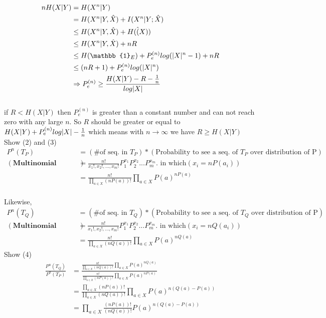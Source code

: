 \documentclass[
  course = {{EE623 Information Theory}},
  quartile = {{4}},
  assignment = 4,
  name = {{Mohammad Mahdi Rahimi}},
  studentnumber = {{20208244}},
  email = {{mahi@kaist.ac.kr}},
  firstexercise = 1
]{aga-homework}
\begin{document}
\begin{equation} \label{eq3}
\begin{split}
nH(X|Y) & = H(X^n|Y) \\
& = H(X^n|Y, \hat{X}) + I(X^n|Y; \hat{X})\\
& \le  H(X^n|Y, \hat{X}) + H(\hat(X))\\
& \le  H(X^n|Y, \hat{X}) + nR\\
& \le H(\mathbb{1}_E) + P^{(n)}_e log(|X|^n - 1) + nR\\
& \le (nR + 1) + P^{(n)}_e log(|X|^n)\\
& \Rightarrow P^{(n)}_e \ge \frac{H(X|Y) - R - {1 \over n}}{log|X|}
\end{split}
\end{equation}\\
if $R < H(X|Y)$ then $P^{(n)}_e$ is greater than a constant number and can not reach zero with any large $n$. So $R$ should be greater or equal to $H(X|Y) + P^{(n)}_e log|X| - {1 \over n}$ which means with $n \rightarrow \infty$ we have $R \ge H(X|Y)$
\\
\exercise
\subexercise Show (2) and (3)
\begin{equation} \label{eq3}
\begin{split}
P^n(T_P) & = (\text{\# of seq. in }T_P) * (\text{Probability to see a seq. of } T_P \text{ over distribution of P})\\
(\textbf{Multinomial distribution})& = \frac{n!}{x_1!, x_2!, ..., x_m!}P^{x_1}_1P^{x_2}_2...P^{x_m}_m. \text{ in which} (x_i = nP(a_i))\\
& = \frac{n!}{\prod_{a \in X} (nP(a))!}\prod_{a \in X} P(a)^{nP(a)}
\end{split}
\end{equation}\\
Likewise,\\
\begin{equation} \label{eq3}
\begin{split}
P^n(T_Q) & = (\text{\# of seq. in }T_Q) * (\text{Probability to see a seq. of } T_Q \text{ over distribution of P})\\
(\textbf{Multinomial distribution})& = \frac{n!}{x_1!, x_2!, ..., x_m!}P^{x_1}_1P^{x_2}_2...P^{x_m}_m. \text{ in which} (x_i = nQ(a_i))\\
& = \frac{n!}{\prod_{a \in X} (nQ(a))!}\prod_{a \in X} P(a)^{nQ(a)}
\end{split}
\end{equation}
\subexercise Show (4)\\
\begin{equation} \label{eq3}
\begin{split}
\frac{P^n(T_Q)}{P^n(T_P)} & = \frac{\frac{n!}{\prod_{a \in X} (nQ(a))!}\prod_{a \in X} P(a)^{nQ(a)}} {\frac{n!}{\prod_{a \in X} (nP(a))!}\prod_{a \in X} P(a)^{nP(a)}}\\
& =  \frac{\prod_{a \in X} (nP(a))!} {\prod_{a \in X} (nQ(a))!} \prod_{a \in X} P(a)^{n(Q(a) - P(a))}\\
& = \prod_{a \in X} \frac{ (nP(a))!} {(nQ(a))!} P(a)^{n(Q(a) - P(a))}
\end{split}
\end{equation}
\end{document}
